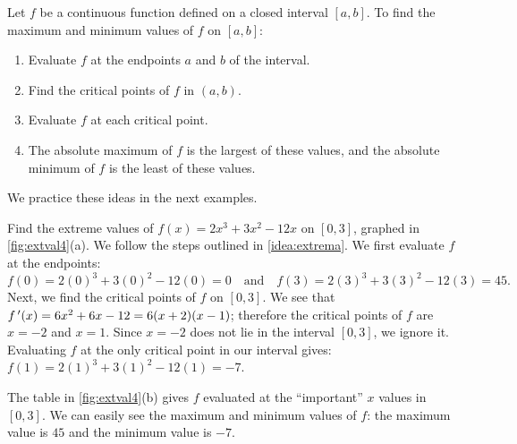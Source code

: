 \begin{keyidea}\label{idea:extrema}%
Let $f$ be a continuous function defined on a closed interval $[a,b]$. To find the maximum and minimum values of $f$ on $[a,b]$:
	\begin{enumerate}
	\item		Evaluate $f$ at the endpoints $a$ and $b$ of the interval.
	\item		Find the critical points of $f$ in $(a,b)$.
	\item		Evaluate $f$ at each critical point.
	\item		The absolute maximum of $f$ is the largest of these values, and the absolute minimum of $f$ is the least of these values.
	\end{enumerate}
\end{keyidea}

We practice these ideas in the next examples.

\begin{example}\label{ex_extval4}%
Find the extreme values of $f(x) = 2x^3+3x^2-12x$ on $[0,3]$, graphed in \autoref{fig:extval4}(a).
\solution
We follow the steps outlined in \autoref{idea:extrema}. We first evaluate $f$ at the endpoints:
%
%
\[f(0)=2(0)^3+3(0)^2-12(0) = 0 \quad \text{and}\quad f(3)=2(3)^3+3(3)^2-12(3) =45.\]
Next, we find the critical points of $f$ on $[0,3]$. We see that $f\,'(x) = 6x^2+6x-12 = 6(x+2)(x-1)$; therefore the critical points of $f$ are $x=-2$ and $x=1$. Since $x=-2$ does not lie in the interval $[0,3]$, we ignore it. Evaluating $f$ at the only critical point in our interval gives: $f(1)=2(1)^3+3(1)^2-12(1) = -7$. 

The table in \autoref{fig:extval4}(b) gives $f$ evaluated at the ``important'' $x$ values in $[0,3]$. We can easily see the maximum and minimum values of $f$: the maximum value is $45$ and the minimum value is $-7$.
\end{example}

